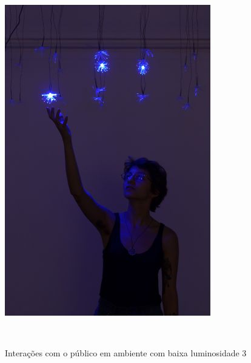 \begin{apendicesenv}
\begin{figure}[H]
  \begin{center}
    \caption{Interações com o público em ambiente com baixa luminosidade 3}
    \vspace*{0,2cm}
    \includegraphics[width=0.8\textwidth]{./04-figuras/instalacao_3}
    \label{fig:instalacao_3}
  \end{center}
  \vspace*{-0,9cm}
  \\
\end{figure}


\end{apendicesenv}
